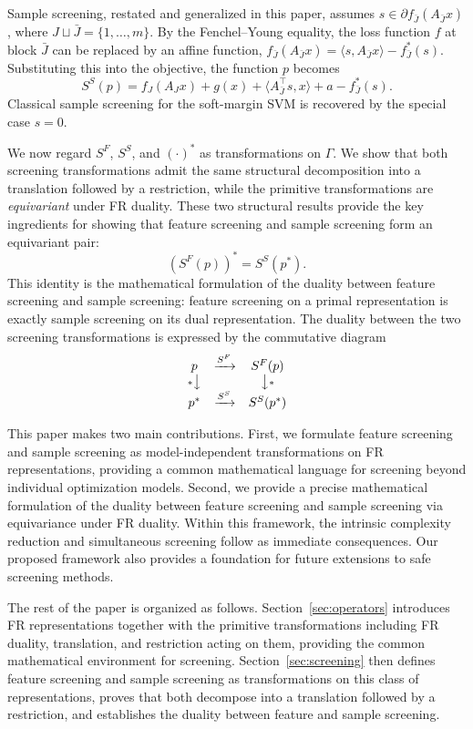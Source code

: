Sample screening, restated and generalized in this paper, assumes
\(s\in\partial f_{\bar J}(A_{\bar J}x)\), where
\(J\sqcup\bar J=\{1,\ldots,m\}\). By the Fenchel--Young equality, the loss function \(f\) at block \(\bar J\) can be replaced by an affine function,
\(
f_{\bar J}(A_{\bar J}x)
=
\langle s,A_{\bar J}x\rangle
-
f_{\bar J}^*(s).
\)
Substituting this into the objective, the function \(p\) becomes
\[
    S^S(p)
    =
    f_J(A_Jx)
    +g(x)
    +\langle A_{\bar J}^{\top}s,x\rangle
    +a
    -f_{\bar J}^*(s).
\]
Classical sample screening for the soft-margin SVM \citep{ogawa2013} is recovered by the special case
\(s=0\).

We now regard \(S^F\), \(S^S\), and \((\cdot)^*\) as transformations on
\(\Gamma\). We show that both screening transformations admit the same
structural decomposition into a translation followed by a restriction,
while the primitive transformations are \emph{equivariant} under FR
duality. These two structural results provide the key ingredients for
showing that feature screening and sample screening form an
equivariant pair:
\[
    (S^F(p))^*
    =
    S^S(p^*).
\]
This identity is the mathematical
formulation of the duality between feature screening and sample
screening: feature screening on a primal representation is exactly
sample screening on its dual representation. The duality between the
two screening transformations is expressed by the
commutative diagram
\[
\begin{array}{ccc}
p & \xrightarrow{S^F} & S^F(p)\\
{\scriptstyle *}\big\downarrow & & \big\downarrow{\scriptstyle *}\\
p^* & \xrightarrow{S^S} & S^S(p^*)
\end{array}
\]

This paper makes two main contributions. First, we formulate feature
screening and sample screening as model-independent transformations on
FR representations, providing a common mathematical language for
screening beyond individual optimization models. Second, we provide a
precise mathematical formulation of the duality between feature
screening and sample screening via equivariance under FR duality. Within this framework, the intrinsic complexity reduction and simultaneous screening follow as immediate consequences.
Our proposed framework also provides
a foundation for future extensions to safe screening methods.


The rest of the paper is organized as follows. Section~\ref{sec:operators} introduces FR representations together with the primitive transformations including FR duality, translation, and restriction acting on them, providing the common mathematical environment for screening. Section~\ref{sec:screening} then defines feature screening and sample screening as transformations on this class of representations, proves that both decompose into a translation followed by a restriction, and establishes the duality between feature and sample screening.

